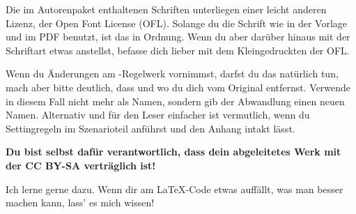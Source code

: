 {{			\item Die im Autorenpaket enthaltenen Schriften unterliegen einer leicht anderen Lizenz, der Open Font License (OFL). Solange du die Schrift wie in der Vorlage und im PDF benutzt, ist das in Ordnung. Wenn du aber darüber hinaus mit der Schriftart etwas anstellst, befasse dich lieber mit dem Kleingedruckten der OFL.
			\item Wenn du Änderungen am \nipajin-Regel\-werk vornimmst, darfst du das natürlich tun, mach aber bitte deutlich, dass und wo du dich vom Original entfernst. Verwende in diesem Fall nicht mehr  als Namen, sondern gib der Abwandlung einen neuen Namen. Alternativ und für den Leser einfacher ist vermutlich, wenn du Settingregeln im Szenarioteil anführst und den Anhang intakt lässt.
		}

		\noindent\textbf{Du bist selbst dafür verantwortlich, dass dein abgeleitetes Werk mit der CC BY-SA verträglich ist!}


		\noindent
		Ich lerne gerne dazu. Wenn dir am \LaTeX-Code etwas auffällt, was man besser machen kann, lass' es mich wissen!

}

\renewcommand{\tocPrologue}{Prolog}
\renewcommand{\headlinePrologue}{Prolog \say{Mein Szenario}}
\renewcommand{\teaserPrologue}{Der Spielleiter sollte folgenden Text zu Beginn des Szenarios vorlesen oder austeilen:}
\renewcommand{\textPrologue}{\zlabel{labelPrologue}%

	\noindent
	Hier kommt der Prolog hin.

	\lipsum[1-5]

}

